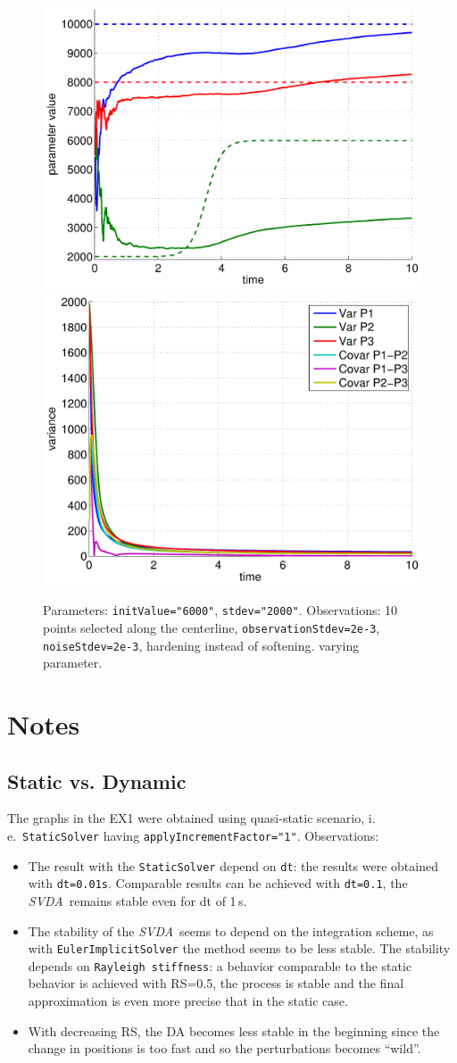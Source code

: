 \documentclass[10pt]{article}
\def\ie{i.\,e.}
\def\svda{\textit{SVDA}}
\begin{document}
\begin{figure}[h]
\begin{center}
\includegraphics[width=.49\linewidth]{figures/pHardSmooth3_estim.pdf}
\hfill
\includegraphics[width=.49\linewidth]{figures/pHardSmooth3_var.pdf}
\caption{Parameters: \texttt{initValue="6000"}, \texttt{stdev="2000"}. Observations: 10 points selected along the centerline,
\texttt{observationStdev=2e-3}, \texttt{noiseStdev=2e-3}, hardening instead of softening.
varying parameter.}
\label{fig:Results9}
\end{center}
\end{figure}



\section{Notes}

\subsection{Static vs. Dynamic}
The graphs in the EX1 were obtained using quasi-static scenario, \ie\ \texttt{StaticSolver} having \texttt{applyIncrementFactor="1"}. Observations:
\begin{itemize}
 \item The result with the \texttt{StaticSolver} depend on \texttt{dt}: the results were obtained with \texttt{dt=0.01s}. Comparable results can be
achieved with \texttt{dt=0.1}, 
 the \svda\ remains stable even for dt of 1\,s.
 \item The stability of the \svda\ seems to depend on the integration scheme, as with \texttt{EulerImplicitSolver} the method seems to be less stable.
The stability depends on \texttt{Rayleigh stiffness}: a behavior comparable to the static behavior is achieved with RS=0.5, the process is stable and
the final approximation is even more precise that in the static case. 
\item With decreasing RS, the DA becomes less stable in the beginning since the change in positions is too fast and so the perturbations becomes
``wild''. 
\end{itemize}
\end{document}
